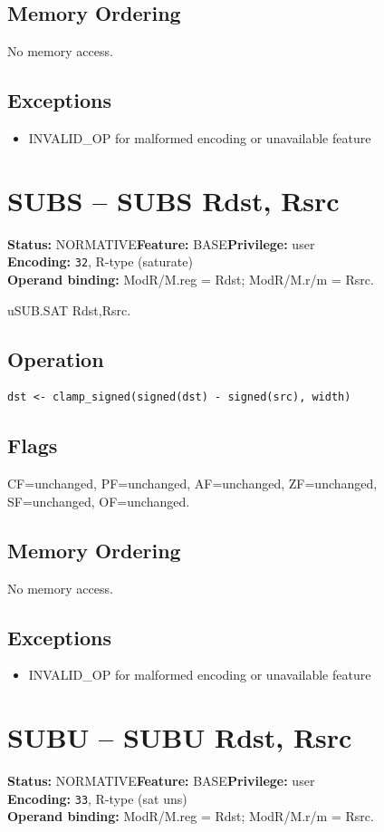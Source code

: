 \documentclass[10pt]{article}
\begin{document}
\subsection*{Memory Ordering}
No memory access.
\subsection*{Exceptions}
\begin{itemize}
\item INVALID\_OP for malformed encoding or unavailable feature
\end{itemize}
\clearpage

\section{SUBS -- SUBS Rdst, Rsrc}
\textbf{Status:} NORMATIVE\quad \textbf{Feature:} BASE\quad \textbf{Privilege:} user\\
\textbf{Encoding:} \texttt{32}, R-type (saturate)\\
\textbf{Operand binding:} ModR/M.reg = Rdst; ModR/M.r/m = Rsrc.

uSUB.SAT Rdst,Rsrc.

\subsection*{Operation}
\begin{lstlisting}
dst <- clamp_signed(signed(dst) - signed(src), width)
\end{lstlisting}
\subsection*{Flags}
CF=unchanged, PF=unchanged, AF=unchanged, ZF=unchanged, SF=unchanged, OF=unchanged.
\subsection*{Memory Ordering}
No memory access.
\subsection*{Exceptions}
\begin{itemize}
\item INVALID\_OP for malformed encoding or unavailable feature
\end{itemize}
\clearpage

\section{SUBU -- SUBU Rdst, Rsrc}
\textbf{Status:} NORMATIVE\quad \textbf{Feature:} BASE\quad \textbf{Privilege:} user\\
\textbf{Encoding:} \texttt{33}, R-type (sat uns)\\
\textbf{Operand binding:} ModR/M.reg = Rdst; ModR/M.r/m = Rsrc.
\end{document}
